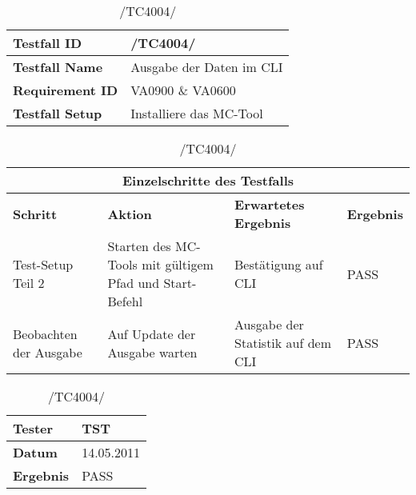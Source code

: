 \begin{table}[h]
    \caption{/TC4004/}
    \label{tab:TC4004}
    \begin{center}
        \begin{tabular}{|p{3.5cm}|p{11cm}|}
            \hline
                \textbf{Testfall ID} & /TC4004/\\
            \hline
                \textbf{Testfall Name} & Ausgabe der Daten im CLI\\
            \hline
                \textbf{Requirement ID} & VA0900 \& VA0600\\
            \hline
                \textbf{Testfall Setup} & Installiere das MC-Tool\\
            \hline
        \end{tabular}
        \begin{tabular}{|p{2cm}|p{3.9cm}|p{3.9cm}|p{3.8cm}|}
            \multicolumn{4}{|c|}{\textbf{Einzelschritte des Testfalls}} \\
            \hline
                \textbf{Schritt} & \textbf{Aktion} & \textbf{Erwartetes
                Ergebnis} & \textbf{Ergebnis}\\
            \hline
                Test-Setup Teil 2 & Starten des MC-Tools mit gültigem Pfad und
                Start-Befehl & Bestätigung auf CLI & PASS\\
            \hline
                Beobachten der Ausgabe & Auf Update der Ausgabe warten & Ausgabe
                der Statistik auf dem CLI & PASS\\
            \hline
        \end{tabular}
        \begin{tabular}{|p{3.5cm}|p{11cm}|}
                \textbf{Tester} & TST\\
            \hline
                \textbf{Datum} & 14.05.2011\\
            \hline
                \textbf{Ergebnis} & PASS\\
            \hline
        \end{tabular}
    \end{center}
\end{table}

